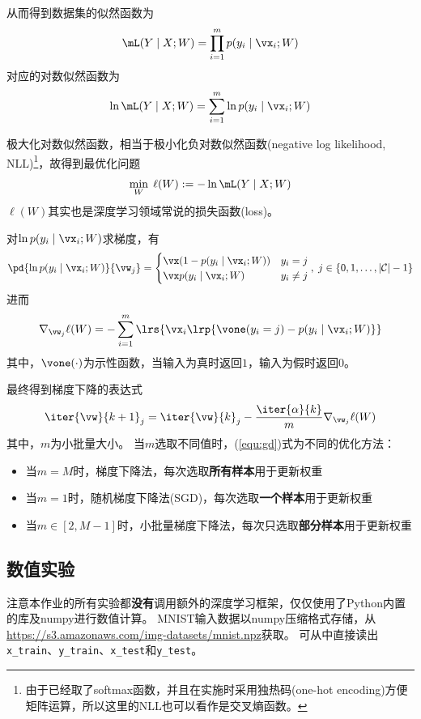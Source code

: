 \documentclass[logo,reportComp]{thesis}
\begin{document}
从而得到数据集的似然函数为
\[\mL(Y\mid X;W)=\prod_{i=1}^m p(y_i\mid\vx_i;W)\]
对应的对数似然函数为
\[\ln\mL(Y\mid X;W)=\sum_{i=1}^m\ln p(y_i\mid\vx_i;W)\]

极大化对数似然函数，相当于极小化负对数似然函数(negative log likelihood, NLL)\footnote{由于已经取了softmax函数，并且在实施时采用独热码(one-hot encoding)方便矩阵运算，所以这里的NLL也可以看作是交叉熵函数。}，故得到最优化问题
\begin{equation}
\min_W \;\ell(W):=-\ln\mL(Y\mid X;W)
\end{equation}
$\ell(W)$其实也是深度学习领域常说的损失函数(loss)。

对$\ln p(y_i\mid\vx_i;W)$求梯度，有
\[\pd{\ln p(y_i\mid\vx_i;W)}{\vw_j}=
\begin{cases}
\vx(1-p(y_i\mid\vx_i;W)) & y_i=j\\
\vx p(y_i\mid\vx_i;W) & y_i\ne j
\end{cases},\;j\in\{0,1,\ldots,|\mathcal{C}|-1\}\]
进而
\begin{equation}
\nabla_{\vw_j}\ell(W)=-\sum_{i=1}^m\lrs{\vx_i\lrp{\vone(y_i=j)-p(y_i\mid\vx_i;W)}}
\end{equation}
其中，$\vone(\cdot)$为示性函数，当输入为真时返回$1$，输入为假时返回$0$。

最终得到梯度下降的表达式
\begin{equation}
\label{equ:gd}
\iter{\vw}{k+1}_j=\iter{\vw}{k}_j-\frac{\iter{\alpha}{k}}{m}\nabla_{\vw_j}\ell(W)
\end{equation}
其中，$m$为小批量大小。
当$m$选取不同值时，(\ref{equ:gd})式为不同的优化方法：
\begin{itemize}
\item 当$m=M$时，梯度下降法，每次选取\textbf{所有样本}用于更新权重
\item 当$m=1$时，随机梯度下降法(SGD)，每次选取\textbf{一个样本}用于更新权重
\item 当$m\in[2,M-1]$时，小批量梯度下降法，每次只选取\textbf{部分样本}用于更新权重
\end{itemize}

\subsection{数值实验}
注意本作业的所有实验都\textbf{没有}调用额外的深度学习框架，仅仅使用了Python内置的库及numpy进行数值计算。
MNIST输入数据以numpy压缩格式存储，从\url{https://s3.amazonaws.com/img-datasets/mnist.npz}获取。
可从中直接读出\verb'x_train'、\verb'y_train'、\verb'x_test'和\verb'y_test'。
\end{document}
